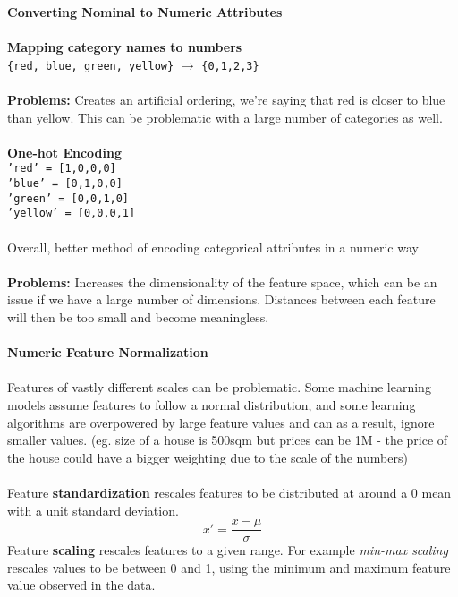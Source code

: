 \documentclass[a4paper,10pt]{article}
\begin{document}
\newpage
\noindent \textcolor{Periwinkle}{\textbf{Converting Nominal to Numeric Attributes}}\\\\
\textbf{Mapping category names to numbers} \\
\texttt{\{red, blue, green, yellow\}} $\rightarrow$ \texttt{\{0,1,2,3\}}\\\\
\textbf{Problems:} Creates an artificial ordering, we're saying that red is closer to blue than yellow. This can be problematic with a large number of categories as well. \\\\
\textbf{One-hot Encoding} \\
\texttt{'red' = [1,0,0,0]} \\
\texttt{'blue' = [0,1,0,0]} \\
\texttt{'green' = [0,0,1,0]} \\
\texttt{'yellow' = [0,0,0,1]} \\\\
Overall, better method of encoding categorical attributes in a numeric way \\\\
\textbf{Problems:} Increases the dimensionality of the feature space, which can be an issue if we have a large number of dimensions. Distances between each feature will then be too small and become meaningless.\\\\ 
\textcolor{Periwinkle}{\textbf{Numeric Feature Normalization}}\\\\
Features of vastly different scales can be problematic. Some machine learning models assume features to follow a normal distribution, and some learning algorithms are overpowered by large feature values and can as a result, ignore smaller values. (eg. size of a house is 500sqm but prices can be 1M - the price of the house could have a bigger weighting due to the scale of the numbers)\\\\
Feature \textbf{standardization} rescales features to be distributed at around a 0 mean with a unit standard deviation. \\
\begin{equation*}
	x' = \frac{x - \mu}{\sigma}
\end{equation*} 
\newline 
Feature \textbf{scaling} rescales features to a given range. For example \emph{min-max scaling} rescales values to be between 0 and 1, using the minimum and maximum feature value observed in the data. \\
\end{document}
